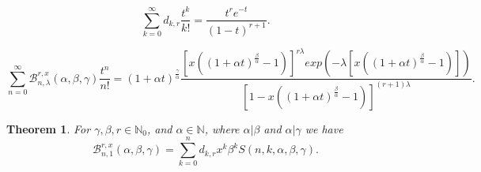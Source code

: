 \documentclass[10pt,a4paper]{amsart}
\newtheorem{theorem}{Theorem}
\begin{document}
	\begin{equation}\label{equation:1}
		\sum_{k=0}^{\infty}d_{k,r}\frac{t^k}{k!}=\frac{t^re^{-t}}{(1-t)^{r+1}}.
\end{equation}

\begin{equation}\label{equation:4}
	\sum\limits_{n=0}^{\infty}\mathcal{B}^{r,x}_{n,\lambda}(\alpha,\beta,\gamma)\frac{t^n}{n!}=(1+\alpha t)^{\frac{\gamma}{\alpha}}\frac{[x((1+\alpha t)^\frac{\beta}{\alpha}-1)]^{r\lambda}exp(-\lambda[x((1+\alpha t)^\frac{\beta}{\alpha}-1)])}{[1-x((1+\alpha t)^\frac{\beta}{\alpha}-1)]^{(r+1)\lambda}}.
\end{equation}

\begin{theorem} \label{theorem:5}For $\gamma,\beta,r\in\mathbb{N}_0$, and $\alpha\in \mathbb{N}$, where ${\alpha}|\beta$ and ${\alpha}|\gamma$ we have
		\begin{equation}\label{definition:100}
		\mathcal{B}^{r,x}_{n,1}(\alpha,\beta,\gamma)=\sum_{k=0}^{n}d_{k,r}x^{k}\beta^{k} S(n,k,\alpha,\beta,\gamma).
	\end{equation}
\end{theorem}
\end{document}
